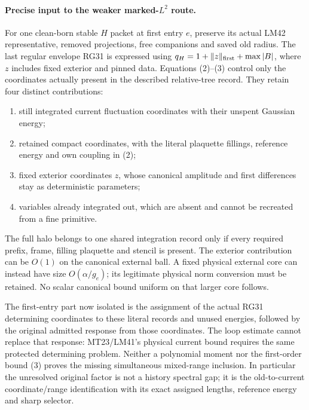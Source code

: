 \documentclass{article}
\begin{document}
\paragraph{Precise input to the weaker marked-$L^2$ route.}
For one clean-born stable $H$ packet at first entry $e$, preserve its actual LM42 representative, removed projections, free companions and saved old radius. The last regular envelope RG31 is expressed using $q_H=1+\|z\|_{\rm first}+\max|B|$, where $z$ includes fixed exterior and pinned data. Equations (2)--(3) control only the coordinates actually present in the described relative-tree record. They retain four distinct contributions:
\begin{enumerate}
\item still integrated current fluctuation coordinates with their unspent Gaussian energy;
\item retained compact coordinates, with the literal plaquette fillings, reference energy and own coupling in (2);
\item fixed exterior coordinates $z$, whose canonical amplitude and first differences stay as deterministic parameters;
\item variables already integrated out, which are absent and cannot be recreated from a fine primitive.
\end{enumerate}
The full halo belongs to one shared integration record only if every required prefix, frame, filling plaquette and stencil is present. The exterior contribution can be $O(1)$ on the canonical external ball. A fixed physical external core can instead have size $O(\alpha/g_e)$; its legitimate physical norm conversion must be retained. No scalar canonical bound uniform on that larger core follows.

The first-entry part now isolated is the assignment of the actual RG31 determining coordinates to these literal records and unused energies, followed by the original admitted response from those coordinates. The loop estimate cannot replace that response: MT23/LM41's physical current bound requires the same protected determining problem. Neither a polynomial moment nor the first-order bound (3) proves the missing simultaneous mixed-range inclusion. In particular the unresolved original factor is not a history spectral gap; it is the old-to-current coordinate/range identification with its exact assigned lengths, reference energy and sharp selector.
\end{document}
